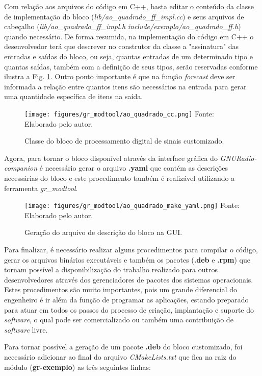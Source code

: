 \documentclass[
  12pt,				%
  openright,			%
  twoside,			%
  a4paper,			%
  english,			%
  french,				%
  spanish,			%
  brazil,				%
  ]{abntex2}
\begin{document}
Com relação aos arquivos do código em C++, basta editar o conteúdo da classe de implementação do bloco (\textit{lib/ao\_quadrado\_ff\_impl.cc}) e seus arquivos de cabeçalho
(\textit{lib/ao\_quadrado\_ff\_impl.h} \textit{include/exemplo/ao\_quadrado\_ff.h}) quando necessário. De forma resumida, na implementação do código em C++ o desenvolvedor terá que descrever
no construtor da classe a "assinatura" das entradas e saídas do bloco, ou seja, quantas entradas de um determinado tipo e quantas saídas, também com a definição de seus tipos, serão reservadas conforme
ilustra a Fig. \ref{fig:ao_quadrado_cc}.
Outro ponto importante é que na função \textit{forecast} deve ser informada a relação entre quantos itens são necessários na entrada para gerar uma quantidade específica de itens na saída.

\begin{figure}[!htb]
  \centering
  \caption{Classe do bloco de processamento digital de sinais customizado.}
  \texttt{[image: figures/gr\_modtool/ao\_quadrado\_cc.png]}
  Fonte: Elaborado pelo autor.
  \label{fig:ao_quadrado_cc}
\end{figure}

Agora, para tornar o bloco disponível através da interface gráfica do \textit{GNURadio-companion} é necessário gerar o arquivo \textbf{.yaml} que contém as descrições necessárias do bloco e
este procedimento também é realizável utilizando a ferramenta \textit{gr\_modtool}.

\begin{figure}[!htb]
  \centering
  \caption{Geração do arquivo de descrição do bloco na GUI.}
  \texttt{[image: figures/gr\_modtool/ao\_quadrado\_make\_yaml.png]}
  Fonte: Elaborado pelo autor.
  \label{fig:ao_quadrado_make_yaml}
\end{figure}

Para finalizar, é necessário realizar alguns procedimentos para compilar o código, gerar os arquivos binários executáveis e também os pacotes (\textbf{.deb} e \textbf{.rpm}) que tornam
possível a disponibilização do trabalho realizado para outros desenvolvedores através dos gerenciadores de pacotes dos sistemas operacionais. Estes procedimentos são muito importantes,
pois um grande diferencial do engenheiro é ir além da função de programar as aplicações, estando preparado para atuar em todos os passos do processo de criação,
implantação e suporte do \textit{software}, o qual pode ser comercializado ou também uma contribuição de \textit{software} livre.

Para tornar possível a geração de um pacote \textbf{.deb} do bloco customizado, foi necessário adicionar ao final do arquivo \textit{CMakeLists.txt}
que fica na raiz do módulo (\textbf{gr-exemplo}) as três seguintes linhas:
\end{document}
